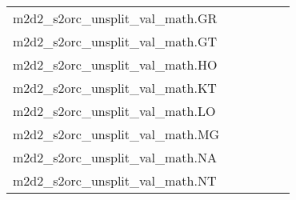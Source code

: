 {\begin{longtable}{m{6cm}m{1.7cm}m{1.7cm}m{1.7cm}m{1.7cm}m{1.7cm}}
	m2d2\_s2orc\_unsplit\_val\_math.GR  & \colorbox[HTML]{77c578}{\makebox[\mywidth][c]{7.39}} & \colorbox[HTML]{e5f5ac}{\makebox[\mywidth][c]{7.66}} & \colorbox[HTML]{ffffe5}{\makebox[\mywidth][c]{9.00}} & \colorbox[HTML]{b8e293}{\makebox[\mywidth][c]{7.51}} & \colorbox[HTML]{84cb7d}{\makebox[\mywidth][c]{7.41}}\\
	m2d2\_s2orc\_unsplit\_val\_math.GT  & \colorbox[HTML]{77c578}{\makebox[\mywidth][c]{7.47}} & \colorbox[HTML]{d9f0a3}{\makebox[\mywidth][c]{7.71}} & \colorbox[HTML]{ffffe5}{\makebox[\mywidth][c]{9.27}} & \colorbox[HTML]{bde395}{\makebox[\mywidth][c]{7.62}} & \colorbox[HTML]{78c679}{\makebox[\mywidth][c]{7.47}}\\
	m2d2\_s2orc\_unsplit\_val\_math.HO  & \colorbox[HTML]{c6e89a}{\makebox[\mywidth][c]{14.52}} & \colorbox[HTML]{e6f5ad}{\makebox[\mywidth][c]{14.70}} & \colorbox[HTML]{ffffe5}{\makebox[\mywidth][c]{16.52}} & \colorbox[HTML]{c2e698}{\makebox[\mywidth][c]{14.51}} & \colorbox[HTML]{77c578}{\makebox[\mywidth][c]{14.31}}\\
	m2d2\_s2orc\_unsplit\_val\_math.KT  & \colorbox[HTML]{77c578}{\makebox[\mywidth][c]{7.54}} & \colorbox[HTML]{e3f4aa}{\makebox[\mywidth][c]{7.80}} & \colorbox[HTML]{ffffe5}{\makebox[\mywidth][c]{9.14}} & \colorbox[HTML]{c8e89a}{\makebox[\mywidth][c]{7.70}} & \colorbox[HTML]{90d082}{\makebox[\mywidth][c]{7.58}}\\
	m2d2\_s2orc\_unsplit\_val\_math.LO  & \colorbox[HTML]{77c578}{\makebox[\mywidth][c]{9.84}} & \colorbox[HTML]{f1f9b4}{\makebox[\mywidth][c]{10.41}} & \colorbox[HTML]{ffffe5}{\makebox[\mywidth][c]{12.53}} & \colorbox[HTML]{cdeb9d}{\makebox[\mywidth][c]{10.13}} & \colorbox[HTML]{b7e193}{\makebox[\mywidth][c]{10.03}}\\
	m2d2\_s2orc\_unsplit\_val\_math.MG  & \colorbox[HTML]{77c578}{\makebox[\mywidth][c]{8.25}} & \colorbox[HTML]{e2f3a9}{\makebox[\mywidth][c]{8.53}} & \colorbox[HTML]{ffffe5}{\makebox[\mywidth][c]{9.99}} & \colorbox[HTML]{c5e799}{\makebox[\mywidth][c]{8.42}} & \colorbox[HTML]{7cc77a}{\makebox[\mywidth][c]{8.26}}\\
	m2d2\_s2orc\_unsplit\_val\_math.NA  & \colorbox[HTML]{86cc7e}{\makebox[\mywidth][c]{9.85}} & \colorbox[HTML]{d5eea1}{\makebox[\mywidth][c]{10.05}} & \colorbox[HTML]{ffffe5}{\makebox[\mywidth][c]{11.66}} & \colorbox[HTML]{b4e091}{\makebox[\mywidth][c]{9.95}} & \colorbox[HTML]{77c578}{\makebox[\mywidth][c]{9.83}}\\
	m2d2\_s2orc\_unsplit\_val\_math.NT  & \colorbox[HTML]{77c578}{\makebox[\mywidth][c]{8.26}} & \colorbox[HTML]{e1f3a9}{\makebox[\mywidth][c]{8.51}} & \colorbox[HTML]{ffffe5}{\makebox[\mywidth][c]{9.92}} & \colorbox[HTML]{ccea9c}{\makebox[\mywidth][c]{8.43}} & \colorbox[HTML]{9ad486}{\makebox[\mywidth][c]{8.31}}\\

\end{longtable}}
